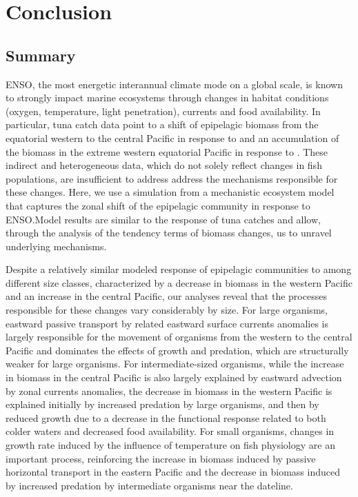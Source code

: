 
\section{Conclusion}
\label{sec:conclusion}


\subsection{Summary}

ENSO, the most energetic interannual climate mode on a  global scale, is known to strongly impact marine ecosystems through changes in habitat conditions (oxygen, temperature, light penetration), currents and food availability. In particular, tuna catch data point to a shift of epipelagic biomass from the equatorial western to the central Pacific in response to \nino{} and an accumulation of the biomass in the extreme western equatorial Pacific in response to \nina{}. These indirect and heterogeneous data, which do not solely reflect changes in fish populations, are insufficient to address address the mechanisms responsible for these changes. Here, we use a simulation from a mechanistic ecosystem model that captures the zonal shift of the epipelagic community in response to ENSO.Model results are similar to the response of tuna catches and allow,
through the analysis of the tendency terms of biomass changes, us to unravel underlying mechanisms.

Despite a relatively similar modeled response of epipelagic communities to \nino{} among different size classes, characterized by a decrease in biomass in the western Pacific and an increase in the central Pacific, our analyses reveal that the processes responsible for these changes vary considerably by size. For large organisms,  eastward passive transport by \nino{} related eastward surface currents anomalies is largely responsible for the movement of organisms from the western to the central Pacific and dominates the effects of growth and predation, which are structurally weaker for large organisms. For intermediate-sized organisms, while the increase in biomass in the central Pacific is also largely explained by eastward advection by zonal currents anomalies, the decrease in biomass in the western Pacific is explained initially by increased predation by large organisms, and then by reduced growth due to a decrease in the functional response related to both colder waters and decreased food availability. For small organisms, changes in growth rate  induced by the influence of temperature on fish physiology are an important process, reinforcing the increase in biomass induced by passive horizontal transport in the eastern Pacific and the decrease in biomass induced by increased predation by intermediate organisms near the dateline.


